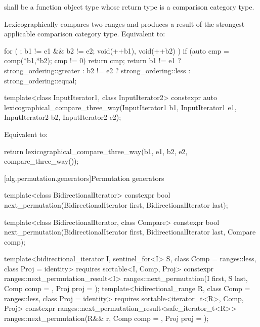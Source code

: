 \begin{itemdescr}
\pnum
\requires
{} shall be a function object type
whose return type is a comparison category type.

\pnum
\effects
Lexicographically compares two ranges and
produces a result of the strongest applicable comparison category type.
Equivalent to:
\begin{codeblock}
for ( ; b1 != e1 && b2 != e2; void(++b1), void(++b2) )
  if (auto cmp = comp(*b1,*b2); cmp != 0)
    return cmp;
return b1 != e1 ? strong_ordering::greater :
       b2 != e2 ? strong_ordering::less :
                  strong_ordering::equal;
\end{codeblock}
\end{itemdescr}

%
\begin{itemdecl}
template<class InputIterator1, class InputIterator2>
  constexpr auto
    lexicographical_compare_three_way(InputIterator1 b1, InputIterator1 e1,
                                      InputIterator2 b2, InputIterator2 e2);
\end{itemdecl}

\begin{itemdescr}
\pnum
\effects
Equivalent to:
\begin{codeblock}
return lexicographical_compare_three_way(b1, e1, b2, e2, compare_three_way());
\end{codeblock}
\end{itemdescr}

[alg.permutation.generators]{Permutation generators}

%
\begin{itemdecl}
template<class BidirectionalIterator>
  constexpr bool next_permutation(BidirectionalIterator first,
                                  BidirectionalIterator last);

template<class BidirectionalIterator, class Compare>
  constexpr bool next_permutation(BidirectionalIterator first,
                                  BidirectionalIterator last, Compare comp);

template<bidirectional_iterator I, sentinel_for<I> S, class Comp = ranges::less,
         class Proj = identity>
  requires sortable<I, Comp, Proj>
  constexpr ranges::next_permutation_result<I>
    ranges::next_permutation(I first, S last, Comp comp = {}, Proj proj = {});
template<bidirectional_range R, class Comp = ranges::less,
         class Proj = identity>
  requires sortable<iterator_t<R>, Comp, Proj>
  constexpr ranges::next_permutation_result<safe_iterator_t<R>>
    ranges::next_permutation(R&& r, Comp comp = {}, Proj proj = {});
\end{itemdecl}

